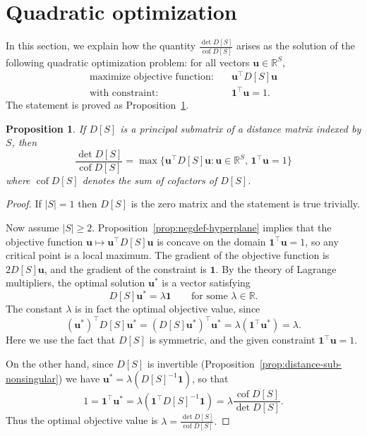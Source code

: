 \documentclass{amsart}
\newtheorem{prop}[thm]{Proposition}
\theoremstyle{definition}
\newcommand{\RR}{\mathbb{R}}
\newcommand{\bone}{\mathbf{1}}
\newcommand{\boldu}{\mathbf{u}}
\newcommand{\tr}{\intercal}
\DeclareMathOperator{\cof}{cof}
\newcommand{\note}[1]{{\color{red} \sf $\diamondsuit$  {#1} $\diamondsuit$ }}
\begin{document}
\section{Quadratic optimization}
\label{sec:optimization}

In this section, we explain how the quantity $\displaystyle \frac{\det D[S]}{\cof D[S]}$ arises as the solution of the following quadratic optimization problem:
for all vectors $ \boldu \in \RR^S$,
\begin{align}
	\text{maximize objective function:} &\quad \boldu^\tr D[S] \boldu \\
	\text{with constraint:} &\quad \bone^\tr \boldu = 1.
\end{align}
The statement is proved as Proposition~\ref{prop:optimization}.

\begin{prop}
\label{prop:optimization}
If $D[S]$ is a principal submatrix of a distance matrix indexed by $S$, then 
\[
	\frac{\det D[S]}{\cof D[S]} = \max \{\boldu^\tr D[S] \boldu : \boldu \in \RR^S,\, \bone^\tr \boldu = 1 \}
\]
where $\cof D[S]$ denotes the sum of cofactors of $D[S]$.
\end{prop}

\begin{proof}
If $|S| = 1$ then $D[S]$ is the zero matrix and the statement is true trivially.

Now assume $|S| \geq 2$.
Proposition~\ref{prop:negdef-hyperplane} implies that 
the objective function $\boldu \mapsto \boldu^\tr D[S]\boldu$ is concave on the domain $\bone^\tr \boldu = 1$,
so any critical point is a local maximum.
The gradient of the objective function is $2 D[S] \boldu$, 
and the gradient of the constraint is $\bone$.
By the theory of Lagrange multipliers, the optimal solution $\boldu^*$ is a vector satisfying
\[
	D[S] \boldu^* = \lambda \bone \qquad\text{for some }\lambda \in \RR.
\]
The constant $\lambda$ is in fact the optimal objective value, since
\[
	(\boldu^*)^\tr D[S] \boldu^* = (D[S] \boldu^*)^\tr \boldu^* = \lambda (\bone^\tr \boldu^*) = \lambda.
\]
Here we use the fact that $D[S]$ is symmetric, and the given constraint $\bone^\tr \boldu = 1$.

On the other hand,
since $D[S]$ is invertible (Proposition~\ref{prop:distance-sub-nonsingular}) we have $ \boldu^* = \lambda (D[S]^{-1} \bone) $, so that
\[
	1 = \bone^\tr \boldu^* = \lambda (\bone^\tr D[S]^{-1} \bone)
	= \lambda \frac{\cof D[S]}{\det D[S]}.
\]
Thus the optimal objective value is
$\displaystyle
	\lambda = \frac{\det D[S]}{\cof D[S]} .
$
\end{proof}
\end{document}
